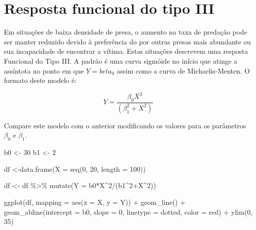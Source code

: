 \documentclass[
]{book}
\newenvironment{Shaded}{\begin{snugshade}}{\end{snugshade}}
\newcommand{\AttributeTok}[1]{\textcolor[rgb]{0.77,0.63,0.00}{#1}}
\newcommand{\DecValTok}[1]{\textcolor[rgb]{0.00,0.00,0.81}{#1}}
\newcommand{\FunctionTok}[1]{\textcolor[rgb]{0.00,0.00,0.00}{#1}}
\newcommand{\NormalTok}[1]{#1}
\newcommand{\OtherTok}[1]{\textcolor[rgb]{0.56,0.35,0.01}{#1}}
\newcommand{\SpecialCharTok}[1]{\textcolor[rgb]{0.00,0.00,0.00}{#1}}
\newcommand{\StringTok}[1]{\textcolor[rgb]{0.31,0.60,0.02}{#1}}
\begin{document}
\hypertarget{resposta-funcional-do-tipo-iii}{%
\section{Resposta funcional do tipo III}\label{resposta-funcional-do-tipo-iii}}

Em situações de baixa densidade de presa, o aumento na taxa de predação pode ser manter reduzido devido à preferência do por outras presas mais abundante ou sua incapacidade de encontrar a vítima. Estas situações descrevem uma resposta Funcional do Tipo III. A padrão é uma curva sigmóide no início que atinge a assíntota no ponto em que \(Y = beta_0\) assim como a curva de Michaelis-Menten. O formato deste modelo é:

\[Y = \frac{\beta_0 X^2}{(\beta_1^2 + X^2)}\]

Compare este modelo com o anterior modificando os valores para os parâmetros \(\beta_0\) e \(\beta_1\).

\begin{Shaded}
\begin{Highlighting}[]
\NormalTok{b0 }\OtherTok{\textless{}{-}} \DecValTok{30}
\NormalTok{b1 }\OtherTok{\textless{}{-}} \DecValTok{2}

\NormalTok{df }\OtherTok{\textless{}{-}}\FunctionTok{data.frame}\NormalTok{(}\AttributeTok{X =} \FunctionTok{seq}\NormalTok{(}\DecValTok{0}\NormalTok{, }\DecValTok{20}\NormalTok{, }\AttributeTok{length =} \DecValTok{100}\NormalTok{))}

\NormalTok{df }\OtherTok{\textless{}{-}}\NormalTok{ df }\SpecialCharTok{\%\textgreater{}\%} \FunctionTok{mutate}\NormalTok{(}\AttributeTok{Y =}\NormalTok{ b0}\SpecialCharTok{*}\NormalTok{X}\SpecialCharTok{\^{}}\DecValTok{2}\SpecialCharTok{/}\NormalTok{(b1}\SpecialCharTok{\^{}}\DecValTok{2}\SpecialCharTok{+}\NormalTok{X}\SpecialCharTok{\^{}}\DecValTok{2}\NormalTok{))}

\FunctionTok{ggplot}\NormalTok{(df, }\AttributeTok{mapping =} \FunctionTok{aes}\NormalTok{(}\AttributeTok{x =}\NormalTok{ X, }\AttributeTok{y =}\NormalTok{ Y)) }\SpecialCharTok{+}
  \FunctionTok{geom\_line}\NormalTok{() }\SpecialCharTok{+}
  \FunctionTok{geom\_abline}\NormalTok{(}\AttributeTok{intercept =}\NormalTok{ b0, }\AttributeTok{slope =} \DecValTok{0}\NormalTok{, }\AttributeTok{linetype =} \StringTok{\textquotesingle{}dotted\textquotesingle{}}\NormalTok{, }\AttributeTok{color =} \StringTok{\textquotesingle{}red\textquotesingle{}}\NormalTok{) }\SpecialCharTok{+}
  \FunctionTok{ylim}\NormalTok{(}\DecValTok{0}\NormalTok{, }\DecValTok{35}\NormalTok{)}
\end{Highlighting}
\end{Shaded}
\end{document}
